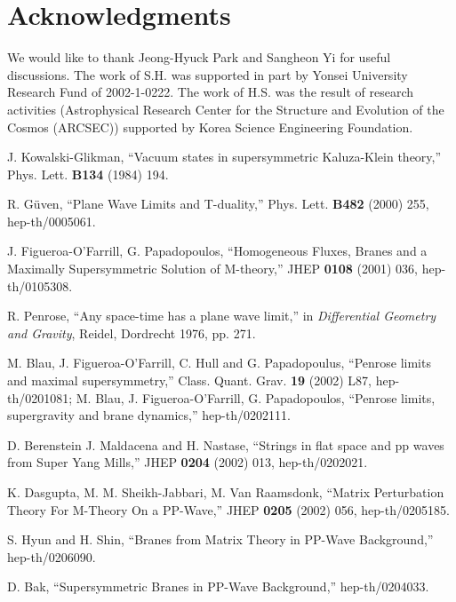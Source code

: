 \documentclass[a4paper,12pt]{article}
\begin{document}
\section*{Acknowledgments}
We would like to thank Jeong-Hyuck Park and Sangheon Yi for useful
discussions.  The work of S.H. was supported in part by Yonsei
University Research Fund of 2002-1-0222.  The work of H.S. was the
result of research activities (Astrophysical Research Center for the
Structure and Evolution of the Cosmos (ARCSEC)) supported by Korea
Science \myHighlight{$\&$}\coordHE{} Engineering Foundation.




\begin{thebibliography}{99}
  
 J. Kowalski-Glikman, ``Vacuum states in
  supersymmetric Kaluza-Klein theory,'' Phys. Lett. {\bf B134} (1984)
  194.

 R. G\"{u}ven, ``Plane Wave Limits and T-duality,''
  Phys. Lett. {\bf B482} (2000) 255, hep-th/0005061.

 J. Figueroa-O'Farrill, G. Papadopoulos, ``Homogeneous
  Fluxes, Branes and a Maximally Supersymmetric Solution of
  M-theory,'' JHEP {\bf 0108} (2001) 036, hep-th/0105308.

 R. Penrose, ``Any space-time has a plane wave
  limit,'' in {\it Differential Geometry and Gravity}, Reidel,
  Dordrecht 1976, pp. 271.
  
 M. Blau, J. Figueroa-O'Farrill, C. Hull and G.
  Papadopoulus, ``Penrose limits and maximal supersymmetry,'' Class.
  Quant. Grav. {\bf 19} (2002) L87, hep-th/0201081; M. Blau, J.
  Figueroa-O'Farrill, G. Papadopoulos, ``Penrose limits, supergravity
  and brane dynamics,'' hep-th/0202111.

 D. Berenstein J. Maldacena and H. Nastase, ``Strings
  in flat space and pp waves from \coordHE{} Super Yang Mills,''
  JHEP {\bf 0204} (2002) 013, hep-th/0202021.

 K. Dasgupta, M. M. Sheikh-Jabbari, M. Van Raamsdonk,
  ``Matrix Perturbation Theory For M-Theory On a PP-Wave,'' JHEP {\bf
    0205} (2002) 056, hep-th/0205185.

 S. Hyun and H. Shin, ``Branes from Matrix Theory in
  PP-Wave Background,'' hep-th/0206090.
  
 D. Bak, ``Supersymmetric Branes in PP-Wave
  Background,'' hep-th/0204033.


\end{thebibliography}
\end{document}
